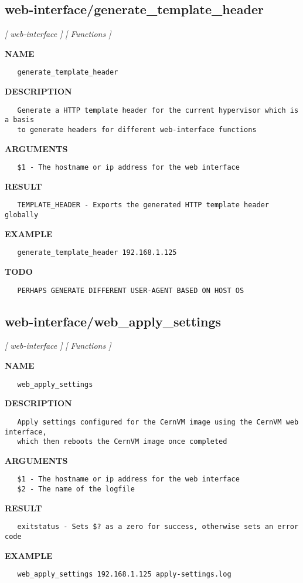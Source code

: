 \subsection{web-interface/generate\_template\_header}
\textsl{[ web-interface ]}
\textsl{[ Functions ]}

\label{ch:robo72}
\label{ch:web_interface_generate_template_header}
\textbf{NAME}
\begin{verbatim}
   generate_template_header
\end{verbatim}
\textbf{DESCRIPTION}
\begin{verbatim}
   Generate a HTTP template header for the current hypervisor which is a basis
   to generate headers for different web-interface functions
\end{verbatim}
\textbf{ARGUMENTS}
\begin{verbatim}
   $1 - The hostname or ip address for the web interface
\end{verbatim}
\textbf{RESULT}
\begin{verbatim}
   TEMPLATE_HEADER - Exports the generated HTTP template header globally
\end{verbatim}
\textbf{EXAMPLE}
\begin{verbatim}
   generate_template_header 192.168.1.125
\end{verbatim}
\textbf{TODO}
\begin{verbatim}
   PERHAPS GENERATE DIFFERENT USER-AGENT BASED ON HOST OS
\end{verbatim}
\newpage
\subsection{web-interface/web\_apply\_settings}
\textsl{[ web-interface ]}
\textsl{[ Functions ]}

\label{ch:robo73}
\label{ch:web_interface_web_apply_settings}
\textbf{NAME}
\begin{verbatim}
   web_apply_settings
\end{verbatim}
\textbf{DESCRIPTION}
\begin{verbatim}
   Apply settings configured for the CernVM image using the CernVM web interface, 
   which then reboots the CernVM image once completed
\end{verbatim}
\textbf{ARGUMENTS}
\begin{verbatim}
   $1 - The hostname or ip address for the web interface
   $2 - The name of the logfile
\end{verbatim}
\textbf{RESULT}
\begin{verbatim}
   exitstatus - Sets $? as a zero for success, otherwise sets an error code
\end{verbatim}
\textbf{EXAMPLE}
\begin{verbatim}
   web_apply_settings 192.168.1.125 apply-settings.log
\end{verbatim}
\newpage

